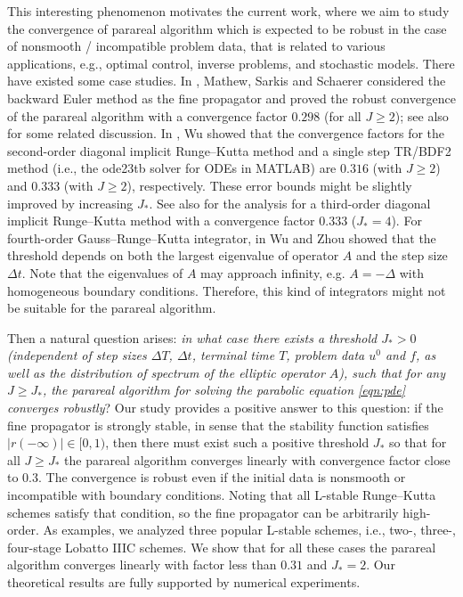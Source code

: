 This interesting phenomenon motivates the current work, where we aim to study the convergence of parareal algorithm which is expected to be robust in the case of nonsmooth / incompatible problem data, that is related to various applications, e.g., optimal control, inverse problems, and stochastic models.
There have existed some case studies.
In \cite{MathewSarkisSchaerer:2010},
Mathew, Sarkis and Schaerer considered
the backward Euler method as the fine propagator  and proved
the robust convergence of the parareal algorithm with a convergence factor $0.298$ (for all $J \ge 2$); see also \cite{GanderVandewalle:2007,Staff:2005} for some related discussion. In \cite{Wu:2015}, Wu showed that the convergence factors
for the second-order diagonal implicit Runge--Kutta method
and a single step TR/BDF2 method (i.e., the ode23tb solver for ODEs in MATLAB)
are $0.316$ (with $J\ge 2$) and $0.333$ (with $J\ge 2$), respectively.
These error bounds might be slightly improved
by increasing $J_*$.
See also \cite{WuZhou:2015} for the analysis for a third-order diagonal implicit Runge--Kutta method with a convergence factor $0.333$ ($J_*=4$). For fourth-order Gauss--Runge--Kutta integrator, in \cite{WuZhou:2015} Wu and Zhou showed that the threshold depends on both the largest eigenvalue of operator $A$ and the step size $\Delta t$. Note that the eigenvalues of $A$ may approach infinity, e.g. $A=-\Delta$ with homogeneous boundary conditions. Therefore, this kind of integrators might not be suitable for the parareal algorithm.

Then a natural question arises: \textsl{in what case there exists a threshold $J_*>0$ (independent of step sizes $\Delta T$, $\Delta t$, terminal time $T$,
problem data $u^0$ and $f$,
as well as the distribution of spectrum of the elliptic
operator $A$), such that
for any $J\ge J_*$, the parareal algorithm for solving the parabolic equation \eqref{eqn:pde} converges robustly}?
Our study provides a positive answer to this question: if the fine propagator is strongly stable, in sense that the stability function satisfies $|r(-\infty)| \in [0,1)$, then
there must exist such a positive threshold $J_*$ so that for all $J\ge J_*$
the parareal algorithm converges linearly with convergence factor close to $0.3$.
The convergence is robust even if the initial data is nonsmooth or incompatible with boundary conditions.
Noting that all L-stable Runge--Kutta schemes satisfy that condition, so the fine propagator  can be arbitrarily high-order.
As examples, we analyzed three popular L-stable schemes, i.e., two-, three-, four-stage Lobatto IIIC schemes. We show that for all these cases the parareal algorithm converges linearly with factor less than $0.31$
and $J_*=2$.
Our theoretical results are fully supported by numerical experiments.

